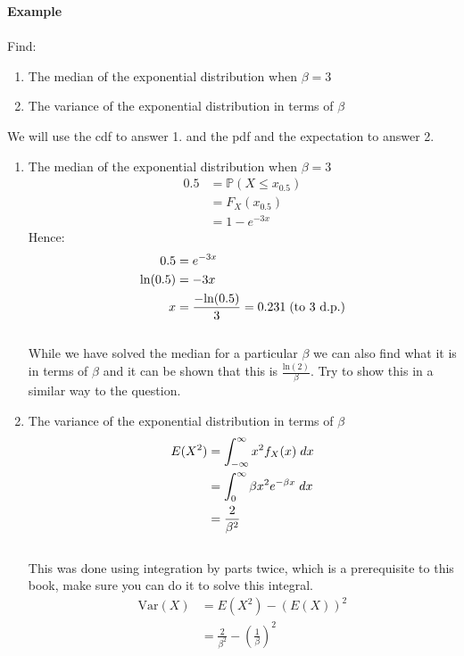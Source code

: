 \documentclass[,oneside]{article}
\begin{document}
\begin{enumerate}
\textbf{Example}\\ \\
Find:\\
\begin{enumerate}
\item The median of the exponential distribution when $\beta = 3$
\item The variance of the exponential distribution in terms of $\beta$\\ 
\end{enumerate}
We will use the cdf to answer 1. and the pdf and the expectation to answer 2. \\
\begin{enumerate}
\item The median of the exponential distribution when $\beta = 3$
\begin{align*}
0.5 &= \mathbb{P}(X \leq x_{0.5})\\
&= F_X(x_{0.5})\\
&= 1-e^{-3x}
\end{align*}
Hence:
\begin{align*}
0.5 &= e^{-3x} \\
\text{ln}(0.5) &= -3x \\
x &= \frac{-\text{ln}(0.5)}{3} = 0.231 \hspace{0.1cm} \text{(to 3 d.p.)}
\end{align*}\\
While we have solved the median for a particular $\beta$ we can also find what it is in terms of $\beta$ and it can be shown that this is $\frac{\text{ln}(2)}{\beta}$. Try to show this in a similar way to the question.
\item The variance of the exponential distribution in terms of $\beta$
\begin{align*}
E(X^2)&=\int_{-\infty}^{\infty} x^2 f_X(x)\hspace{0.1cm}dx\\
&= \int_{0}^{\infty} \beta x^2 e^{-\beta x}\hspace{0.1cm}dx\\
&= \frac{2}{\beta^2}
\end{align*}\\
This was done using integration by parts twice, which is a prerequisite to this book, make sure you can do it to solve this integral. \\
\begin{align*}
\text{Var}(X)&=E(X^2)-(E(X))^2\\
&= \frac{2}{\beta^2}- \left (\frac{1}{\beta} \right )^2\\

\end{align*}
\end{enumerate}
\end{enumerate}
\end{document}
